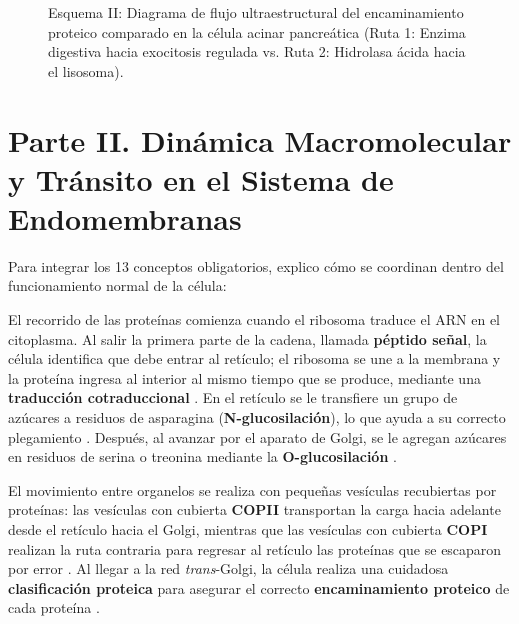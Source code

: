 \documentclass[spanish,letterpaper,oneside]{article}
\begin{document}
\begin{figure}[htbp]
\caption{Esquema II: Diagrama de flujo ultraestructural del encaminamiento proteico comparado en la célula acinar pancreática (Ruta 1: Enzima digestiva hacia exocitosis regulada vs. Ruta 2: Hidrolasa ácida hacia el lisosoma).}
\label{fig:esquema_rutas}
\end{figure}

\clearpage

\section{Parte II. Dinámica Macromolecular y Tránsito en el Sistema de Endomembranas}
Para integrar los 13 conceptos obligatorios, explico cómo se coordinan dentro del funcionamiento normal de la célula:

El recorrido de las proteínas comienza cuando el ribosoma traduce el ARN en el citoplasma. Al salir la primera parte de la cadena, llamada \textbf{péptido señal}, la célula identifica que debe entrar al retículo; el ribosoma se une a la membrana y la proteína ingresa al interior al mismo tiempo que se produce, mediante una \textbf{traducción cotraduccional} \parencite{salazar2018biologia, alberts2022molecular}. En el retículo se le transfiere un grupo de azúcares a residuos de asparagina (\textbf{N-glucosilación}), lo que ayuda a su correcto plegamiento \parencite{mathews2013bioquimica}. Después, al avanzar por el aparato de Golgi, se le agregan azúcares en residuos de serina o treonina mediante la \textbf{O-glucosilación} \parencite{karp2019biologia}.

El movimiento entre organelos se realiza con pequeñas vesículas recubiertas por proteínas: las vesículas con cubierta \textbf{COPII} transportan la carga hacia adelante desde el retículo hacia el Golgi, mientras que las vesículas con cubierta \textbf{COPI} realizan la ruta contraria para regresar al retículo las proteínas que se escaparon por error \parencite{fortoul2020histologia, lodish2021molecular}. Al llegar a la red \textit{trans}-Golgi, la célula realiza una cuidadosa \textbf{clasificación proteica} para asegurar el correcto \textbf{encaminamiento proteico} de cada proteína \parencite{alberts2022molecular}.
\end{document}
